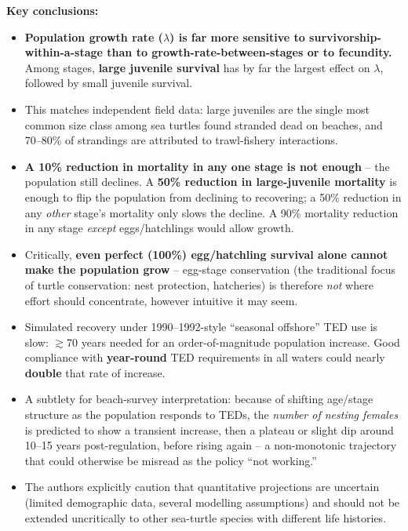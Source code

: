 \documentclass[11pt,a4paper]{article}
\begin{document}
\begin{papbox}[title={Paper Summary: Crowder, Crouse, Heppell \& Martin (1994), \textit{Ecol.\ Appl.} -- ``Predicting the Impact of Turtle Excluder Devices on Loggerhead Sea Turtle Populations''}]
\textbf{Key conclusions:}
\begin{itemize}[leftmargin=1.3em,nosep]
\item \textbf{Population growth rate ($\lambda$) is far more sensitive to survivorship-within-a-stage than to growth-rate-between-stages or to fecundity.} Among stages, \textbf{large juvenile survival} has by far the largest effect on $\lambda$, followed by small juvenile survival.
\item This matches independent field data: large juveniles are the single most common size class among sea turtles found stranded dead on beaches, and 70--80\% of strandings are attributed to trawl-fishery interactions.
\item \textbf{A 10\% reduction in mortality in any one stage is not enough} -- the population still declines. A \textbf{50\% reduction in large-juvenile mortality} is enough to flip the population from declining to recovering; a 50\% reduction in any \emph{other} stage's mortality only slows the decline. A 90\% mortality reduction in any stage \emph{except} eggs/hatchlings would allow growth.
\item Critically, \textbf{even perfect (100\%) egg/hatchling survival alone cannot make the population grow} -- egg-stage conservation (the traditional focus of turtle conservation: nest protection, hatcheries) is therefore \emph{not} where effort should concentrate, however intuitive it may seem.
\item Simulated recovery under 1990--1992-style ``seasonal offshore'' TED use is slow: $\gtrsim$70 years needed for an order-of-magnitude population increase. Good compliance with \textbf{year-round} TED requirements in all waters could nearly \textbf{double} that rate of increase.
\item A subtlety for beach-survey interpretation: because of shifting age/stage structure as the population responds to TEDs, the \emph{number of nesting females} is predicted to show a transient increase, then a plateau or slight dip around 10--15 years post-regulation, before rising again -- a non-monotonic trajectory that could otherwise be misread as the policy ``not working.''
\item The authors explicitly caution that quantitative projections are uncertain (limited demographic data, several modelling assumptions) and should not be extended uncritically to other sea-turtle species with different life histories.
\end{itemize}
\end{papbox}
\end{document}
